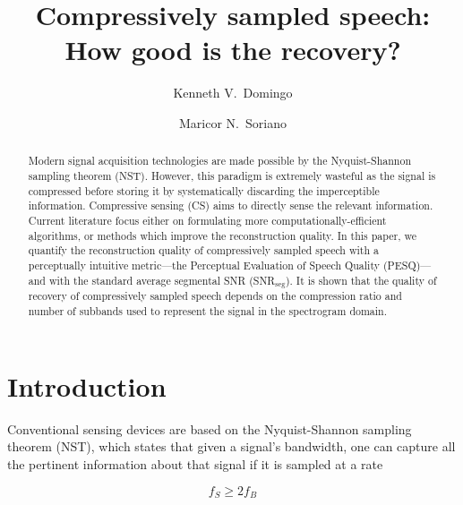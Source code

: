 \documentclass[10pt,a4paper,twoside]{article}
\newcommand{\snrseg}{SNR$_{\mathrm{seg}}$}
\begin{document}


\title{\TitleFont Compressively sampled speech: How good is the recovery?}

\author[*\negthickspace]{Kenneth V.~Domingo}
\author[ ]{Maricor N.~Soriano
\lastauthorsep}


\begin{abstract}
\noindent
Modern signal acquisition technologies are made possible by the Nyquist-Shannon sampling theorem (NST). However, this paradigm is extremely wasteful as the signal is compressed before storing it by systematically discarding the imperceptible information. Compressive sensing (CS) aims to directly sense the relevant information. Current literature focus either on formulating more computationally-efficient algorithms, or methods which improve the reconstruction quality. In this paper, we quantify the reconstruction quality of compressively sampled speech with a perceptually intuitive metric---the Perceptual Evaluation of Speech Quality (PESQ)---and with the standard average segmental SNR (\snrseg). It is shown that the quality of recovery of compressively sampled speech depends on the compression ratio and number of subbands used to represent the signal in the spectrogram domain.


\end{abstract}

\maketitle
\thispagestyle{titlestyle}

\section{Introduction}\label{sec:intro}
Conventional sensing devices are based on the Nyquist-Shannon sampling theorem (NST), which states that given a signal's bandwidth, one can capture all the pertinent information about that signal if it is sampled at a rate

\begin{equation} \label{eq:nst}
	f_S \geq 2f_B
\end{equation}
\end{document}
